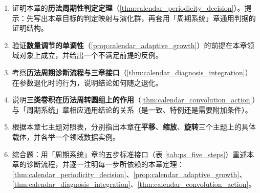 \begin{enumerate}[leftmargin=3em, label=\textbf{题 \arabic*}]
    \item 证明本章的\textbf{历法周期性判定定理}（\ref{thm:calendar_periodicity_decision}）。提示：先写出本章目标的判定映射与演化群，再套用「周期系统」章通用判据的证明结构。

    \item 验证\textbf{数量调节的单调性}（\ref{prop:calendar_adaptive_growth}）的前提在本章领域对象上成立，并给出一个不满足前提的反例。

    \item 考察\textbf{历法周期诊断流程与三章接口}（\ref{thm:calendar_diagnosis_integration}）在参数退化时的行为，说明结论如何随之退化。

    \item 说明\textbf{三类卷积在历法周转圆组上的作用}（\ref{thm:calendar_convolution_action}）与「周期系统」章相应通用结论的关系（是一致、特例还是需要附加条件）。

    \item 根据本章七主题对照表，分别指出本章在\textbf{平移}、\textbf{缩放}、\textbf{旋转}三个主题上的具体载体，并各举一个领域数据实例。

    \item 综合题：用「周期系统」章的五步标准接口（表 \ref{tab:ps_five_steps}）重述本章的诊断流程，并逐一注明每一步所依赖的本章定理：\ref{thm:calendar_periodicity_decision}、\ref{prop:calendar_adaptive_growth}、\ref{thm:calendar_diagnosis_integration}、\ref{thm:calendar_convolution_action}。
\end{enumerate}


